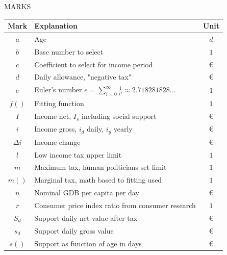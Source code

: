 %
%
%
MARKS
\label{marks}

\begin{center}
\begin{supertabular}{ c l c }
  Mark	 & Explanation					&  Unit		 \\
\hline
$ a	$& Age						&$ d		$\\
$ b	$& Base number to select			&$ 1		$\\
$ c	$& Coefficient to select for income period	&$ \euro	$\\
$ d	$& Daily allowance, "negative tax"		&$ \euro	$\\
$e$&Euler's number $e=\sum_{i=0}^{\infty}\frac1{i!}\approx2.718281828...$&$1$\\
$ f()	$& Fitting function				&$ 1		$\\
$ I	$& Income net, $I_s$ including social support	&$ \euro	$\\
$ i	$& Income gross, $i_d$ daily, $i_y$ yearly	&$ \euro	$\\
$\Delta i$& Income change				&$ \euro	$\\
$ l	$& Low income tax upper limit			&$ 1		$\\
$ m	$& Maximum tax, human politicians set limit	&$ 1		$\\
$ m()	$& Marginal tax, math based to fitting used	&$ 1		$\\
$ n	$& Nominal GDB per capita per day		&$ \euro	$\\
$ r	$& Consumer price index ratio from consumer research&$ 1	$\\
$ S_d	$& Support daily net value after tax		&$ \euro	$\\
$ s_d	$& Support daily gross value			&$ \euro	$\\
$ s()	$& Support as function of age in days		&$ \euro	$\\

\end{supertabular}
\end{center}
